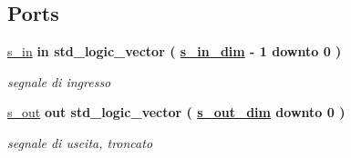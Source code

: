 \subsection*{Ports}
 \begin{DoxyCompactItemize}
\item 
\hyperlink{group___truncate_ga6d6bd3ddfff26c223f1752f25545e304}{s\+\_\+in}  {\bfseries {\bfseries \textcolor{vhdlchar}{in}\textcolor{vhdlchar}{ }}} {\bfseries \textcolor{vhdlchar}{std\+\_\+logic\+\_\+vector}\textcolor{vhdlchar}{ }\textcolor{vhdlchar}{(}\textcolor{vhdlchar}{ }\textcolor{vhdlchar}{ }\textcolor{vhdlchar}{ }\textcolor{vhdlchar}{ }{\bfseries \hyperlink{group___truncate_gad3d18243ad6fe53a2277e2aa9b94ca45}{s\+\_\+in\+\_\+dim}} \textcolor{vhdlchar}{-\/}\textcolor{vhdlchar}{ } \textcolor{vhdldigit}{1} \textcolor{vhdlchar}{ }\textcolor{vhdlchar}{downto}\textcolor{vhdlchar}{ }\textcolor{vhdlchar}{ } \textcolor{vhdldigit}{0} \textcolor{vhdlchar}{ }\textcolor{vhdlchar}{)}\textcolor{vhdlchar}{ }} 
\begin{DoxyCompactList}\small\item\em segnale di ingresso \end{DoxyCompactList}\item 
\hyperlink{group___truncate_ga7c0b5e84820296cfa624ce710d19debd}{s\+\_\+out}  {\bfseries {\bfseries \textcolor{vhdlchar}{out}\textcolor{vhdlchar}{ }}} {\bfseries \textcolor{vhdlchar}{std\+\_\+logic\+\_\+vector}\textcolor{vhdlchar}{ }\textcolor{vhdlchar}{(}\textcolor{vhdlchar}{ }\textcolor{vhdlchar}{ }\textcolor{vhdlchar}{ }\textcolor{vhdlchar}{ }{\bfseries \hyperlink{group___truncate_ga8b62f8bfecb0fab845995b8b051101bc}{s\+\_\+out\+\_\+dim}} \textcolor{vhdlchar}{ }\textcolor{vhdlchar}{downto}\textcolor{vhdlchar}{ }\textcolor{vhdlchar}{ } \textcolor{vhdldigit}{0} \textcolor{vhdlchar}{ }\textcolor{vhdlchar}{)}\textcolor{vhdlchar}{ }} 
\begin{DoxyCompactList}\small\item\em segnale di uscita, troncato \end{DoxyCompactList}\end{DoxyCompactItemize}
